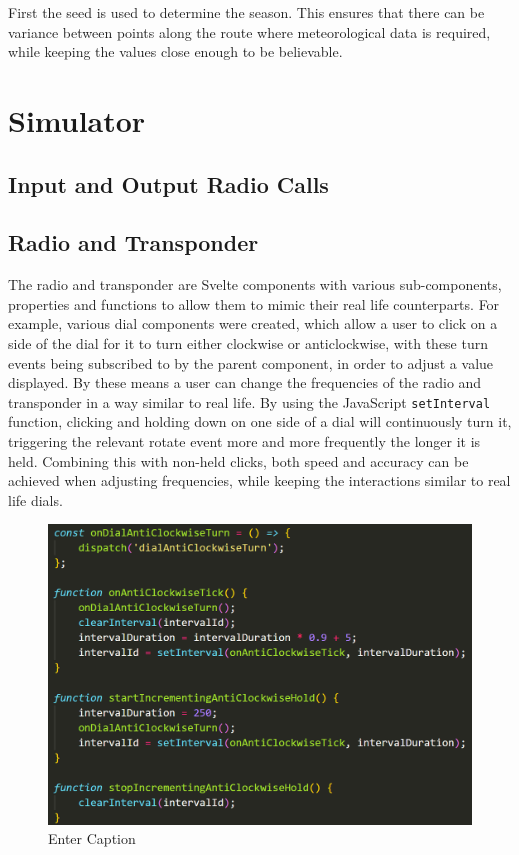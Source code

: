 First the seed is used to determine the season. This ensures that there can be variance between points along the route where meteorological data is required, while keeping the values close enough to be believable. 

\section{Simulator}
\label{se:sim}

\subsection{Input and Output Radio Calls}
\label{sse:inputoutput}

\subsection{Radio and Transponder}
\label{sse:radiotransponder}
The radio and transponder are Svelte components with various sub-components, properties and functions to allow them to mimic their real life counterparts. For example, various dial components were created, which allow a user to click on a side of the dial for it to turn either clockwise or anticlockwise, with these turn events being subscribed to by the parent component, in order to adjust a value displayed. By these means a user can change the frequencies of the radio and transponder in a way similar to real life. By using the JavaScript \texttt{setInterval} function, clicking and holding down on one side of a dial will continuously turn it, triggering the relevant rotate event more and more frequently the longer it is held. Combining this with non-held clicks, both speed and accuracy can be achieved when adjusting frequencies, while keeping the interactions similar to real life dials.

\begin{figure}
    \centering
    \includegraphics[width=0.5\linewidth]{document-resources//images/dial-turn-code.png}
    \caption{Enter Caption}
    \label{fig:enter-label}
\end{figure}

